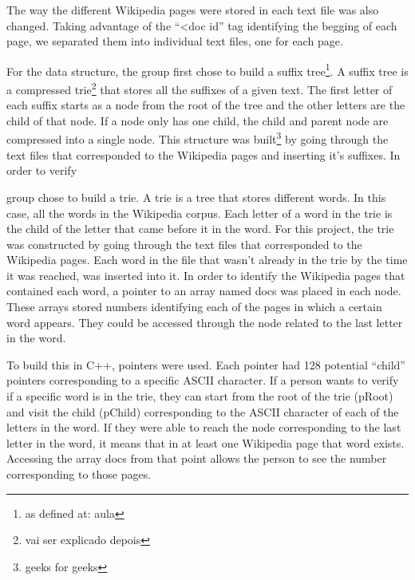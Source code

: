 \documentclass{article}
\begin{document}
The way the different Wikipedia pages were stored in each text file was also changed. Taking advantage of the ``<doc id'' tag identifying the begging of each page, we separated them into individual text files, one for each page. 

For the data structure, the group first chose to build a suffix tree\footnote{as defined at: aula}. A suffix tree is a compressed trie\footnote{vai ser explicado depois} that stores all the suffixes of a given text. The first letter of each suffix starts as a node from the root of the tree and the other letters are the child of that node. If a node only has one child, the child and parent node are compressed into a single node. This structure was built\footnote{geeks for geeks} by going through the text files that corresponded to the Wikipedia pages and inserting it's suffixes. In order to verify 


group chose to build a trie. A trie is a tree that stores different words. In this case, all the words in the Wikipedia corpus. Each letter of a word in the trie is the child of the letter that came before it in the word. 
For this project, the trie was constructed by going through the text files that corresponded to the Wikipedia pages. Each word in the file that wasn't already in the trie by the time it was reached, was inserted into it. In order to identify the Wikipedia pages that contained each word, a pointer to an array named docs was placed in each node. These arrays stored numbers identifying each of the pages in which a certain word appears. They could be accessed through the node related to the last letter in the word. 

To build this in C++, pointers were used. Each pointer had 128 potential ``child'' pointers corresponding to a specific ASCII character. If a person wants to verify if a specific word is in the trie, they can start from the root of the trie (pRoot) and visit the child (pChild) corresponding to the ASCII character of each of the letters in the word. If they were able to reach the node corresponding to the last letter in the word, it means that in at least one Wikipedia page that word exists. Accessing the array docs from that point allows the person to see the number corresponding to those pages.

\end{document}
